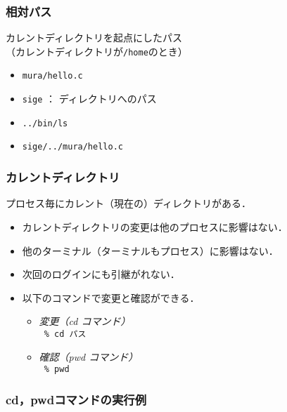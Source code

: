 \documentclass{beamer}                 %
\begin{document}
\begin{frame}[fragile]
  \frametitle{相対パス}

  カレントディレクトリを起点にしたパス\\
  （カレントディレクトリが\texttt{/home}のとき）
  \begin{itemize}
  \item \texttt{mura/hello.c}
  \item \texttt{sige} ： ディレクトリへのパス
  \item \texttt{../bin/ls}
  \item \texttt{sige/../mura/hello.c}
  \end{itemize}
\end{frame}

\begin{frame}[fragile]
  \frametitle{カレントディレクトリ}

  プロセス毎にカレント（現在の）ディレクトリがある．
  \begin{itemize}
  \item カレントディレクトリの変更は他のプロセスに影響はない．
  \item 他のターミナル（ターミナルもプロセス）に影響はない．
  \item 次回のログインにも引継がれない．
  \item 以下のコマンドで変更と確認ができる．
    \begin{itemize}
      \item \emph{変更（cd コマンド）} \\
        \texttt{ \% cd パス }
      \item \emph{確認（pwd コマンド）} \\
        \texttt{ \% pwd }
    \end{itemize}
  \end{itemize}
\end{frame}

\begin{frame}[fragile]
  \frametitle{cd，pwdコマンドの実行例}

  \begin{minipage}{0.4\columnwidth}
  \end{minipage}
  \begin{minipage}{0.55\columnwidth}
  \end{minipage}
\end{frame}
\end{document}
